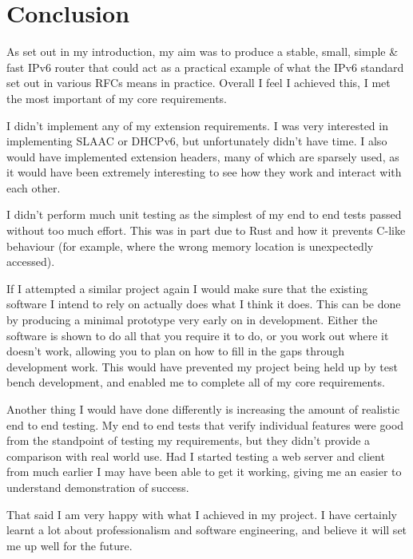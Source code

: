 \documentclass[12pt,a4paper,twoside,openany]{report}
\begin{document}
\chapter{Conclusion}

As set out in my introduction, my aim was to produce a stable, small, simple \& fast IPv6 router that could act as a practical example of what the IPv6 standard set out in various RFCs means in practice.  Overall I feel I achieved this, I met the most important of my core requirements.

\bigskip

I didn't implement any of my extension requirements.  I was very interested in implementing SLAAC or DHCPv6, but unfortunately didn't have time.  I also would have implemented extension headers, many of which are sparsely used, as it would have been extremely interesting to see how they work and interact with each other.

\bigskip

I didn't perform much unit testing as the simplest of my end to end tests passed without too much effort.  This was in part due to Rust and how it prevents C-like behaviour (for example, where the wrong memory location is unexpectedly accessed).

\bigskip

If I attempted a similar project again I would make sure that the existing software I intend to rely on actually does what I think it does.  This can be done by producing a minimal prototype very early on in development.  Either the software is shown to do all that you require it to do, or you work out where it doesn't work, allowing you to plan on how to fill in the gaps through development work.  This would have prevented my project being held up by test bench development, and enabled me to complete all of my core requirements.

\bigskip

Another thing I would have done differently is increasing the amount of realistic end to end testing.  My end to end tests that verify individual features were good from the standpoint of testing my requirements, but they didn't provide a comparison with real world use.  Had I started testing a web server and client from much earlier I may have been able to get it working, giving me an easier to understand demonstration of success.

\bigskip

That said I am very happy with what I achieved in my project. I have certainly learnt a lot about professionalism and software engineering, and believe it will set me up well for the future. 
\end{document}
